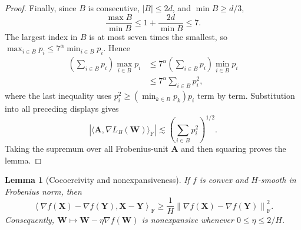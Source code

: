 \documentclass[11pt]{article}
\newtheorem{lemma}[lemma]{Lemma}
\theoremstyle{definition}
\newcommand{\Ab}{\mathbf{A}}
\newcommand{\Wb}{\mathbf{W}}
\newcommand{\Xb}{\mathbf{X}}
\newcommand{\Yb}{\mathbf{Y}}
\newcommand{\normF}[1]{\left\lVert #1\right\rVert_{\mathrm F}}
\begin{document}
\begin{proof}
Finally, since $B$ is consecutive, $|B|\le 2d$, and $\min B\ge d/3$,
\[
\frac{\max B}{\min B}
\le
1+\frac{2d}{\min B}
\le 7.
\]
The largest index in $B$ is at most seven times the smallest, so
$\max_{i\in B}p_i\leq7^\alpha\min_{i\in B}p_i$.  Hence
\begin{align*}
 \left(\sum_{i\in B}p_i\right)\max_{i\in B}p_i
 &\leq7^\alpha
 \left(\sum_{i\in B}p_i\right)\min_{i\in B}p_i\\
 &\leq7^\alpha\sum_{i\in B}p_i^2,
\end{align*}
where the last inequality uses
$p_i^2\geq(\min_{k\in B}p_k)p_i$ term by term.  Substitution into all
preceding displays gives
\[
 |\langle\Ab,\nabla L_B(\Wb)\rangle_{\mathrm F}|
 \lesssim\left(\sum_{i\in B}p_i^2\right)^{1/2}.
\]
Taking the supremum over all Frobenius-unit $\Ab$ and then squaring proves
the lemma.
\end{proof}

\begin{lemma}[Cocoercivity and nonexpansiveness]
\label{lem:cocoercive-v2}
If $f$ is convex and $H$-smooth in Frobenius norm, then
\[
 \left\langle
  \nabla f(\Xb)-\nabla f(\Yb),\Xb-\Yb
 \right\rangle_{\mathrm F}
 \geq\frac1H\normF{\nabla f(\Xb)-\nabla f(\Yb)}^2.
\]
Consequently, $\Wb\mapsto\Wb-\eta\nabla f(\Wb)$ is nonexpansive whenever
$0\leq\eta\leq2/H$.
\end{lemma}
\end{document}
